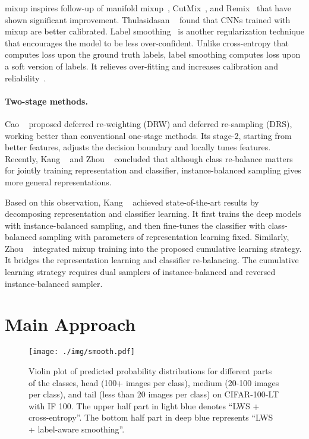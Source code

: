 \documentclass[final]{cvpr}
\begin{document}
	mixup inspires follow-up of manifold mixup~\cite{mmixup}, CutMix~\cite{cutmix}, and Remix~\cite{remix} that have shown significant improvement. Thulasidasan \etal~\cite{mixup_ca} found that CNNs trained with mixup are better calibrated. Label smoothing~\cite{labelsmoothing} is another regularization technique that encourages the model to be less over-confident. Unlike cross-entropy that computes loss upon the ground truth labels, label smoothing computes loss upon a soft version of labels. It relieves over-fitting and increases calibration and reliability~\cite{smooth_ca}.
	
	\vspace{-10pt}
	\paragraph{Two-stage methods.} Cao \etal~\cite{ldam} proposed deferred re-weighting (DRW) and deferred re-sampling (DRS), working better than conventional one-stage methods. Its stage-2, starting from better features, adjusts the decision boundary and locally tunes features. Recently, Kang \etal~\cite{decouple} and Zhou \etal~\cite{bbn} concluded that although class re-balance matters for jointly training representation and classifier, instance-balanced sampling gives more general representations. 
	
	Based on this observation, Kang \etal~\cite{decouple} achieved state-of-the-art results by decomposing representation and classifier learning. It first trains the deep models with instance-balanced sampling, and then fine-tunes the classifier with class-balanced sampling with parameters of representation learning fixed. Similarly, Zhou \etal~\cite{bbn} integrated mixup training into the proposed cumulative learning strategy. It bridges the representation learning and classifier re-balancing. The cumulative learning strategy requires dual samplers of instance-balanced and reversed instance-balanced sampler. 
	
	\vspace{-1pt} 
	
	\section{Main Approach}
	
	\begin{figure*}[t]
		\centering
		\texttt{[image: ./img/smooth.pdf]} 
		\caption{Violin plot of predicted probability distributions for different parts of the classes, head (100+ images per class), medium (20-100 images per class), and tail (less than 20 images per class) on CIFAR-100-LT with IF 100. The upper half part in light blue denotes ``LWS + cross-entropy''. The bottom half part in deep blue represents ``LWS + label-aware smoothing''.}
		\label{fig:smooth}
		\vspace{-5pt}
	\end{figure*}
	
\end{document}
